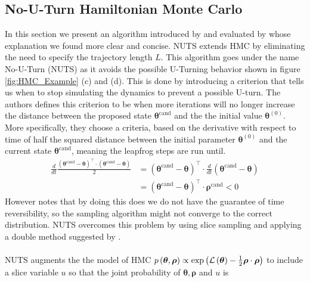 \subsection{No-U-Turn Hamiltonian Monte Carlo}
In this section we present an algorithm introduced by \cite{hoffman2011nouturn} and evaluated by \cite{nishio_arakawa_nouturn} whose explanation we found more clear and concise. NUTS extends HMC by eliminating the need to specify the trajectory length $L$. This algorithm goes under the name No-U-Turn (NUTS) as it avoids the possible U-Turning behavior shown in figure \ref{fig:HMC_Example} (c) and (d). This is done by introducing a criterion that tells us when to stop simulating the dynamics to prevent a possible U-turn. The authors defines this criterion to be when more iterations will no longer increase the distance between the proposed state $\boldsymbol{\theta}^{\text{cand}}$ and the the initial value $\boldsymbol{\theta}^{(0)}$. More specifically, they choose a criteria, based on the derivative with respect to time of half the squared distance between the initial parameter $\boldsymbol{\theta}^{(0)}$ and the current state $\boldsymbol{\theta}^{\text{cand}}$, meaning the leapfrog steps are run until. 
\begin{equation*}
\begin{split}
    \frac{d}{d t} \frac{(\boldsymbol{\theta}^{\text{cand}}-\boldsymbol{\theta})^\top \cdot(\boldsymbol{\theta}^{\text{cand}}-\boldsymbol{\theta})}{2}&=(\boldsymbol{\theta}^{\text{cand}}-\boldsymbol{\theta})^\top \cdot \frac{d}{d t}(\boldsymbol{\theta}^{\text{cand}}-\boldsymbol{\theta})\\
    &=(\boldsymbol{\theta}^{\text{cand}}-\boldsymbol{\theta})^\top \cdot \boldsymbol{\rho}^{\text{cand}} < 0
\end{split}
\end{equation*}
However \cite{hoffman2011nouturn} notes that by doing this does we do not have the guarantee of time reversibility, so the sampling algorithm might not converge to the correct distribution. NUTS overcomes this problem by using slice sampling and applying a double method suggested by \cite{neal_slice_sampling}. 
\\
\\
NUTS augments the the model of HMC $p \left (\boldsymbol{\theta}, \boldsymbol{\rho}\right) \propto \exp{\left(\mathcal{L} \left (\boldsymbol{\theta}\right) - \frac{1}{2} \boldsymbol{\rho} \cdot \boldsymbol{\rho}\right)}$ to include a slice variable $u$ so that the joint probability of $\boldsymbol{\theta}, \boldsymbol{\rho}$ and $u$ is 
